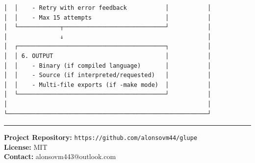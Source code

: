 \documentclass[11pt, a4paper]{article}
\begin{document}
\begin{verbatim}
│  │    - Retry with error feedback           │           │
│  │    - Max 15 attempts                     │           │
│  └────────────┬─────────────────────────────┘           │
│               ↓                                         │
│  ┌──────────────────────────────────────────┐           │
│  │ 6. OUTPUT                                │           │
│  │    - Binary (if compiled language)       │           │
│  │    - Source (if interpreted/requested)   │           │
│  │    - Multi-file exports (if -make mode)  │           │
│  └──────────────────────────────────────────┘           │
│                                                         │
└─────────────────────────────────────────────────────────┘
\end{verbatim}

\begin{center}\rule{0.5\linewidth}{0.5pt}\end{center}

\textbf{Project Repository:}
\texttt{https://github.com/alonsovm44/glupe}\\
\textbf{License:} MIT\\
\textbf{Contact:} alonsovm443@outlook.com
\end{document}
